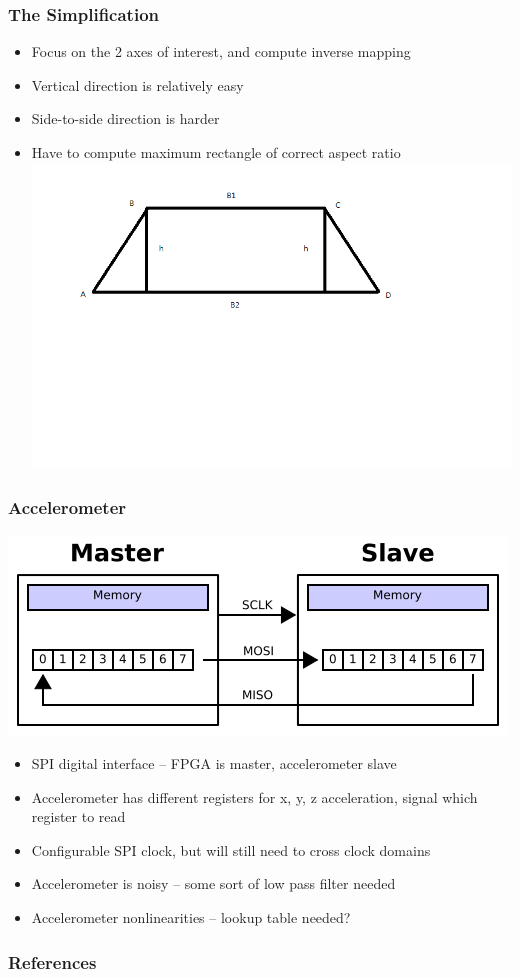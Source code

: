 \documentclass{beamer}
\begin{document}
\begin{frame}
\frametitle{The Simplification}
\begin{itemize}
\item Focus on the 2 axes of interest, and compute inverse mapping
\item Vertical direction is relatively easy
\item Side-to-side direction is harder
\pause
\item Have to compute maximum rectangle of correct aspect ratio
\includegraphics[height=0.7\textheight]{./img/rectangle_in_trapezoid.png}
\end{itemize}
\end{frame}

\begin{frame}
\frametitle{Accelerometer}
\includegraphics[scale=0.4]{img/spi}
\begin{itemize}
\item SPI digital interface -- FPGA is master, accelerometer slave
\item Accelerometer has different registers for x, y, z acceleration, signal which register to read
\item Configurable SPI clock, but will still need to cross clock domains
\item Accelerometer is noisy -- some sort of low pass filter needed
\item Accelerometer nonlinearities -- lookup table needed?
\end{itemize}
\end{frame}

\begin{frame}
\frametitle{References}


\end{frame}
\end{document}
